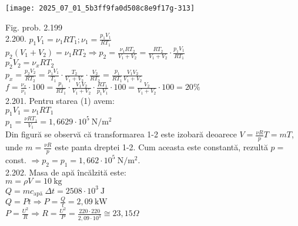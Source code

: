 \begin{center}
\texttt{[image: 2025\_07\_01\_5b3ff9fa0d508c8e9f17g-313]}
\end{center}

Fig. prob. 2.199\\

2.200. $p_{1} V_{1}=\nu_{1} R T_{1} ; \nu_{1}=\frac{p_{1} V_{1}}{R T_{1}}$\\ $p_{2}\left(V_{1}+V_{2}\right)=\nu_{1} R T_{2} \Rightarrow p_{2}=\frac{\nu_{1} R T_{2}}{V_{1}+V_{2}}=\frac{R T_{2}}{V_{1}+V_{2}} \cdot \frac{p_{1} V_{1}}{R T_{1}}$\\ $p_{2} V_{2}=\nu_{x} R T_{2}$\\ $p_{x}=\frac{p_{2} V_{2}}{R T_{2}}=\frac{p_{1} V_{1}}{T_{1}} \cdot \frac{T_{2}}{V_{1}+V_{2}} \cdot \frac{V_{2}}{R T_{2}}=\frac{p_{1}}{R T_{1}} \frac{V_{1} V_{2}}{V_{1}+V_{2}}$\\ $f=\frac{\nu_{x}}{\nu_{1}} \cdot 100=\frac{p_{1}}{R T_{1}} \cdot \frac{V_{1} V_{2}}{V_{1}+V_{2}} \cdot \frac{R T_{1}}{p_{1} V_{1}} \cdot 100=\frac{V_{2}}{V_{1}+V_{2}} \cdot 100=20 \%$\\

2.201. Pentru starea (1) avem:\\ $p_{1} V_{1}=\nu_{1} R T_{1}$\\ $p_{1}=\frac{\nu R T_{1}}{V_{1}}=1,6629 \cdot 10^{5} \mathrm{~N} / \mathrm{m}^{2}$\\ Din figură se observă că transformarea 1-2 este izobară deoarece $V=\frac{\nu R}{p} T=m T$, unde $m=\frac{\nu R}{p}$ este panta dreptei 1-2. Cum aceasta este constantă, rezultă $p=$ const. $\Rightarrow p_{2}=p_{1}=1,662 \cdot 10^{5} \mathrm{~N} / \mathrm{m}^{2}$.\\

2.202. Masa de apă încălzită este:\\ $m=\rho V=10 \mathrm{~kg}$\\ $Q=m c_{\text {apă }} \Delta t=2508 \cdot 10^{3} \mathrm{~J}$\\ $Q=P t \Rightarrow P=\frac{Q}{t}=2,09 \mathrm{~kW}$\\ $P=\frac{U^{2}}{R} \Rightarrow R=\frac{U^{2}}{P}=\frac{220 \cdot 220}{2,09 \cdot 10^{3}} \cong 23,15 \Omega$\\

